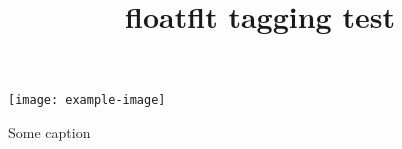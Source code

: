\documentclass{article}
\title{floatflt tagging test}
\begin{document}
\kant[1-2]
\begin{floatingfigure}{0.4\textwidth}
\texttt{[image: example-image]}
\caption{Some caption}
\end{floatingfigure}
\kant[3-4]
\end{document}
